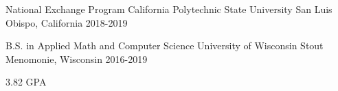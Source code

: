 

\begin{cventries}

  \cventry
  {National Exchange Program} %
  {California Polytechnic State University} %
  {San Luis Obispo, California} %
  {2018-2019} %
  {
  }

  \cventry
  {B.S. in Applied Math and Computer Science} %
  {University of Wisconsin Stout} %
  {Menomonie, Wisconsin} %
  {2016-2019} %
  {
    \begin{cvitems} %
      \item {3.82 GPA}
    \end{cvitems}
  }

\end{cventries}
